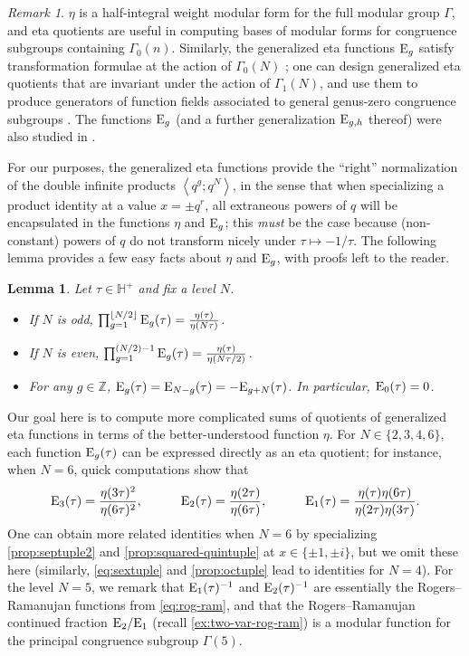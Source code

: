 \documentclass[reqno,11pt]{amsart}
\newtheorem{lemma}[theorem]{Lemma}
\theoremstyle{definition}
\theoremstyle{remark}
\newtheorem*{remark}{Remark}
\numberwithin{equation}{section}
\newcommand{\Z}{\mathbb{Z}}
\renewcommand{\H}{{\mathbb{H}}}
\newcommand{\E}{\textnormal E}
\newcommand{\la}{\left\langle}
\newcommand{\ra}{\right\rangle}
\begin{document}
\begin{remark}
$\eta$ is a half-integral weight modular form for the full modular group $\Gamma$, and eta quotients are useful in computing bases of modular forms for congruence subgroups containing $\Gamma_0(n)$. Similarly, the generalized eta functions $\E_g$ satisfy transformation formulae at the action of $\Gamma_0(N)$ \cite[Corollary 2]{yang2004transformation}; one can design generalized eta quotients that are invariant under the action of $\Gamma_1(N)$, and use them to produce generators of function fields associated to general genus-zero congruence subgroups \cite{yang2004transformation}. The functions $\E_g$ (and a further generalization $\E_{g,h}$ thereof) were also studied in \cite{berndt1973generalized}.

For our purposes, the generalized eta functions provide the ``right'' normalization of the double infinite products $\la q^g; q^N \ra$, in the sense that when specializing a product identity at a value $x = \pm q^r$, all extraneous powers of $q$ will be encapsulated in the functions $\eta$ and $\E_g$; this \emph{must} be the case because (non-constant) powers of $q$ do not transform nicely under $\tau \mapsto -1/\tau$. The following lemma provides a few easy facts about $\eta$ and $\E_g$, with proofs left to the reader.
\end{remark}
\begin{lemma}\label{lem:basic-E}
Let $\tau \in \H^+$ and fix a level $N$.
\begin{itemize}
    \item[(i).] If $N$ is odd, $\prod_{g=1}^{\lfloor N/2 \rfloor} \E_g(\tau) = \frac{\eta(\tau)}{\eta(N\tau)}$.
    \item[(ii).] If $N$ is even, $\prod_{g=1}^{(N/2)-1} \E_g(\tau) = \frac{\eta(\tau)}{\eta(N\tau/2)}$.
    \item[(iii).] For any $g \in \Z$, $\E_g(\tau) = \E_{N-g}(\tau) = -\E_{g+N}(\tau)$. In particular, $\E_0(\tau) = 0$.
\end{itemize}
\end{lemma}
Our goal here is to compute more complicated sums of quotients of generalized eta functions in terms of the better-understood function $\eta$. For $N \in \{2, 3, 4, 6\}$, each function $\E_g(\tau)$ can be expressed directly as an eta quotient; for instance, when $N = 6$, quick computations show that
\[
    \E_3(\tau) = \frac{\eta(3\tau)^2}{\eta(6\tau)^2}
    ,\qquad\quad 
    \E_2(\tau) = \frac{\eta(2\tau)}{\eta(6\tau)}
    ,\qquad\quad 
    \E_1(\tau) = \frac{\eta(\tau)\eta(6\tau)}{\eta(2\tau)\eta(3\tau)}.
\]
One can obtain more related identities when $N = 6$ by specializing \cref{prop:septuple2} and \cref{prop:squared-quintuple} at $x \in \{\pm 1, \pm i\}$, but we omit these here (similarly, \cref{eq:sextuple} and \cref{prop:octuple} lead to identities for $N = 4$). For the level $N = 5$, we remark that $\E_1(\tau)^{-1}$ and $\E_2(\tau)^{-1}$ are essentially the Rogers--Ramanujan functions from \cref{eq:rog-ram}, and that the Rogers--Ramanujan continued fraction $\E_2/\E_1$ (recall \cref{ex:two-var-rog-ram}) is a modular function for the principal congruence subgroup $\Gamma(5)$.
\end{document}
